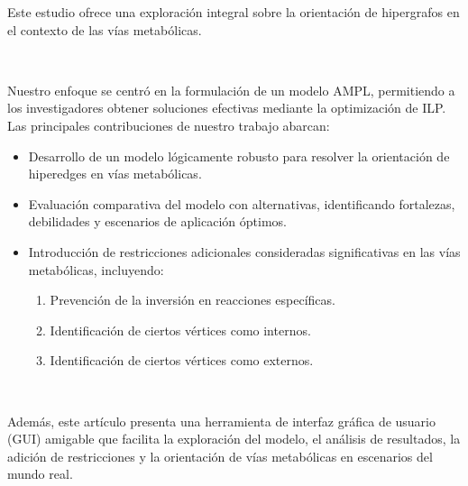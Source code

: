 Este estudio ofrece una exploración integral sobre la orientación de hipergrafos en el contexto de las vías metabólicas.

~

Nuestro enfoque se centró en la formulación de un modelo AMPL, permitiendo a los investigadores obtener soluciones efectivas mediante la optimización de ILP. Las principales contribuciones de nuestro trabajo abarcan:

\begin{itemize}
\item Desarrollo de un modelo lógicamente robusto para resolver la orientación de hiperedges en vías metabólicas.
\item Evaluación comparativa del modelo con alternativas, identificando fortalezas, debilidades y escenarios de aplicación óptimos.
\item Introducción de restricciones adicionales consideradas significativas en las vías metabólicas, incluyendo:
\begin{enumerate}[left=2em]
\item Prevención de la inversión en reacciones específicas.
\item Identificación de ciertos vértices como internos.
\item Identificación de ciertos vértices como externos.
\end{enumerate}
\end{itemize}

~

Además, este artículo presenta una herramienta de interfaz gráfica de usuario (GUI) amigable que facilita la exploración del modelo, el análisis de resultados, la adición de restricciones y la orientación de vías metabólicas en escenarios del mundo real.